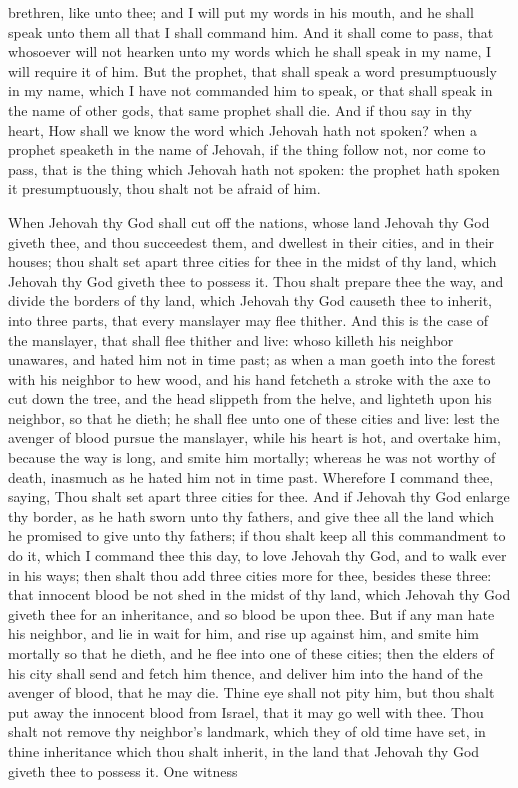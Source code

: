 brethren, like unto thee; and I will put my words in his mouth, and he shall speak unto them all that I shall command him. And it shall come to pass, that whosoever will not hearken unto my words which he shall speak in my name, I will require it of him.  But the prophet, that shall speak a word presumptuously in my name, which I have not commanded him to speak, or that shall speak in the name of other gods, that same prophet shall die. And if thou say in thy heart, How shall we know the word which Jehovah hath not spoken? when a prophet speaketh in the name of Jehovah, if the thing follow not, nor come to pass, that is the thing which Jehovah hath not spoken: the prophet hath spoken it presumptuously, thou shalt not be afraid of him. 

When Jehovah thy God shall cut off the nations, whose land Jehovah thy God giveth thee, and thou succeedest them, and dwellest in their cities, and in their houses; thou shalt set apart three cities for thee in the midst of thy land, which Jehovah thy God giveth thee to possess it. Thou shalt prepare thee the way, and divide the borders of thy land, which Jehovah thy God causeth thee to inherit, into three parts, that every manslayer may flee thither.  And this is the case of the manslayer, that shall flee thither and live: whoso killeth his neighbor unawares, and hated him not in time past; as when a man goeth into the forest with his neighbor to hew wood, and his hand fetcheth a stroke with the axe to cut down the tree, and the head slippeth from the helve, and lighteth upon his neighbor, so that he dieth; he shall flee unto one of these cities and live: lest the avenger of blood pursue the manslayer, while his heart is hot, and overtake him, because the way is long, and smite him mortally; whereas he was not worthy of death, inasmuch as he hated him not in time past. Wherefore I command thee, saying, Thou shalt set apart three cities for thee. And if Jehovah thy God enlarge thy border, as he hath sworn unto thy fathers, and give thee all the land which he promised to give unto thy fathers; if thou shalt keep all this commandment to do it, which I command thee this day, to love Jehovah thy God, and to walk ever in his ways; then shalt thou add three cities more for thee, besides these three: that innocent blood be not shed in the midst of thy land, which Jehovah thy God giveth thee for an inheritance, and so blood be upon thee.  But if any man hate his neighbor, and lie in wait for him, and rise up against him, and smite him mortally so that he dieth, and he flee into one of these cities; then the elders of his city shall send and fetch him thence, and deliver him into the hand of the avenger of blood, that he may die. Thine eye shall not pity him, but thou shalt put away the innocent blood from Israel, that it may go well with thee.  Thou shalt not remove thy neighbor’s landmark, which they of old time have set, in thine inheritance which thou shalt inherit, in the land that Jehovah thy God giveth thee to possess it.  One witness 